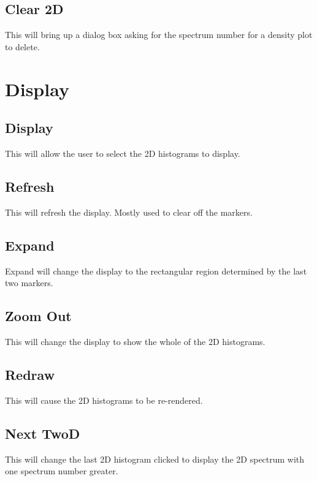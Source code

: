 \subsection{Clear 2D}

This will bring up a dialog box asking for the spectrum number for a density plot to delete.

\section{Display}

\subsection{Display}

This will allow the user to select the 2D histograms to display.

\subsection{Refresh}

This will refresh the display.  Mostly used to clear off the markers.

\subsection{Expand}

Expand will change the display to the rectangular region determined by the last two markers.

\subsection{Zoom Out}

This will change the display to show the whole of the 2D histograms.

\subsection{Redraw}

This will cause the 2D histograms to be re-rendered.

\subsection{Next TwoD}

This will change the last 2D histogram clicked to display the 2D spectrum with one spectrum number greater.

